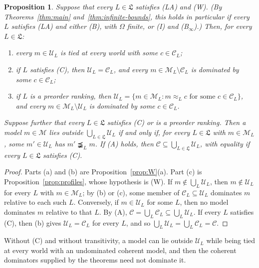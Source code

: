 \documentclass[11pt]{article}
\newtheorem{proposition}[theorem]{Proposition}
\theoremstyle{definition}
\theoremstyle{remark}
\newcommand{\M}{\mathcal M}
\newcommand{\C}{\mathcal C}
\newcommand{\U}{\mathcal U}
\begin{document}
\begin{proposition}\label{prop:permissible}
Suppose that every $L\in\mathfrak L$ satisfies (LA) and (W). (By Theorems~\ref{thm:main} and~\ref{thm:infinite-bounds}, this holds in particular if every $L$ satisfies (LA) and either (B), with $\Omega$ finite, or (I) and (B$_\infty$).) Then, for every $L\in\mathfrak L$:
\begin{enumerate}[label=(\alph*)]
\item every $m\in\U_L$ is tied at every world with some $c\in\C_L$;
\item if $L$ satisfies (C), then $\U_L=\C_L$, and every $m\in\M_L\setminus\C_L$ is dominated by some $c\in\C_L$;
\item if $L$ is a preorder ranking, then $\U_L=\{m\in\M_L:m\approx_L c\text{ for some }c\in\C_L\}$, and every $m\in\M_L\setminus\U_L$ is dominated by some $c\in\C_L$.
\end{enumerate}
Suppose further that every $L\in\mathfrak L$ satisfies (C) or is a preorder ranking. Then a model $m\in\M$ lies outside $\bigcup_{L\in\mathfrak L}\U_L$ if and only if, for every $L\in\mathfrak L$ with $m\in\M_L$, some $m'\in\U_L$ has $m'\precneqq_L m$. If (A) holds, then $\C\subseteq\bigcup_{L\in\mathfrak L}\U_L$, with equality if every $L\in\mathfrak L$ satisfies (C).
\end{proposition}
\begin{proof}
Parts (a) and (b) are Proposition~\ref{prop:W}(a). Part (c) is Proposition~\ref{prop:profiles}, whose hypothesis is (W). If $m\notin\bigcup_L\U_L$, then $m\notin\U_L$ for every $L$ with $m\in\M_L$; by (b) or (c), some member of $\C_L\subseteq\U_L$ dominates $m$ relative to each such $L$. Conversely, if $m\in\U_L$ for some $L$, then no model dominates $m$ relative to that $L$. By (A), $\C=\bigcup_L\C_L\subseteq\bigcup_L\U_L$. If every $L$ satisfies (C), then (b) gives $\U_L=\C_L$ for every $L$, and so $\bigcup_L\U_L=\bigcup_L\C_L=\C$.
\end{proof}
Without (C) and without transitivity, a model can lie outside $\U_L$ while being tied at every world with an undominated coherent model, and then the coherent dominators supplied by the theorems need not dominate it.
\end{document}
